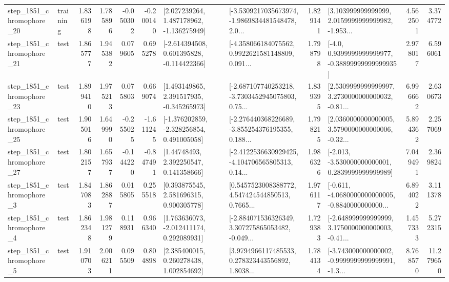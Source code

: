 \begin{tabular}{llrrrrllrlrr}
 step\_1851\_chromophore\_20 &  training &      1.836198 &    1.785896 &     -0.050302 & -0.200140 &    [2.027239264, 1.487178962, -1.136275949] &  [-3.5309217035673974, -1.9869834481548478, 2.0... &       1.829141 &  [3.103999999999999, 2.0159999999999982, -1.953... &            4.562501 &          3.374772 \\
 step\_1851\_chromophore\_21 &      test &      1.865777 &    1.945382 &      0.079605 &  0.695278 &   [-2.614394508, 0.601395828, -0.114422366] &  [-4.358066184075562, 0.9922621581148809, 0.091... &       1.798798 &   [-4.0, 0.9399999999999977, -0.38899999999999935] &            2.978017 &          6.596061 \\
 step\_1851\_chromophore\_23 &      test &      1.899410 &    1.975213 &      0.075803 &  0.669074 &    [1.493149865, 2.391517935, -0.345265973] &  [-2.687107740253218, -3.7303452945075803, 0.75... &       1.839395 &  [2.5309999999999997, 3.2730000000000032, -0.81... &            6.996662 &          2.630673 \\
 step\_1851\_chromophore\_25 &      test &      1.905016 &    1.649990 &     -0.255025 & -1.611245 &   [-1.376202859, -2.328256854, 0.491005058] &  [-2.276440368226689, -3.855254376195355, 0.188... &       1.798215 &  [2.0360000000000005, 3.5790000000000006, -0.32... &            5.894362 &          2.257069 \\
 step\_1851\_chromophore\_27 &      test &      1.802157 &    1.657937 &     -0.144220 & -0.847491 &      [1.44748493, 2.392250547, 0.141358666] &  [-2.4122536630929425, -4.104706565805313, 0.14... &       1.986326 &   [-2.013, -3.530000000000001, 0.2839999999999989] &            7.049491 &          2.369824 \\
  step\_1851\_chromophore\_3 &      test &      1.847083 &    1.862887 &      0.015805 &  0.255518 &     [0.393875545, 2.581696315, 0.900305778] &  [0.5457523008388772, 4.547424544850513, 0.7665... &       1.976117 &  [-0.611, -4.0680000000000005, -0.8840000000000... &            6.894022 &          3.111378 \\
  step\_1851\_chromophore\_4 &      test &      1.862348 &    1.981279 &      0.118931 &  0.966340 &    [1.763636073, -2.012411174, 0.292089931] &  [-2.884071536326349, 3.307275865053482, -0.049... &       1.729383 &  [-2.648999999999999, 3.1750000000000003, -0.41... &            1.457333 &          5.272315 \\
  step\_1851\_chromophore\_5 &      test &      1.910703 &    2.006211 &      0.095509 &  0.804898 &     [2.385400015, 0.260278438, 1.002854692] &  [3.9794966117485533, 0.278323443556892, 1.8038... &       1.784134 &  [-3.743000000000002, -0.9999999999999991, -1.3... &            8.768570 &         11.279650 \\

\end{tabular}
